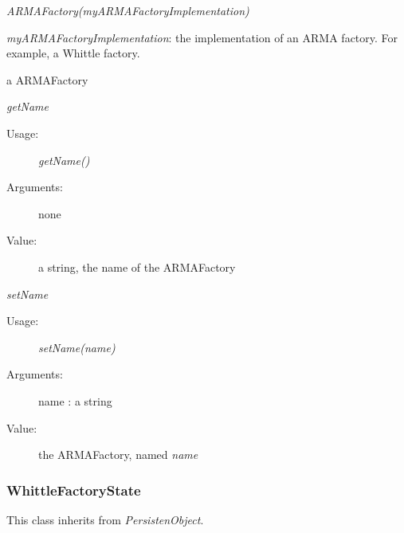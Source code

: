\begin{description}

\item[Usage:] \rule{0pt}{1em}
\begin{description}
\item \textit{ARMAFactory(myARMAFactoryImplementation)}
\end{description}
\bigskip

\item[Arguments:] \textit{myARMAFactoryImplementation}: the implementation of an ARMA factory. For example, a Whittle factory.

\bigskip

\item[Value:] a ARMAFactory
\bigskip

\item[Some methods :]  \rule{0pt}{1em}

\begin{description}

\item \textit{getName}
\begin{description}
\item[Usage:] \textit{getName()}
\item[Arguments:] none
\item[Value:] a string, the name of the ARMAFactory
\end{description}
\bigskip

\item \textit{setName}
\begin{description}
\item[Usage:] \textit{setName(name)}
\item[Arguments:] name : a string
\item[Value:] the ARMAFactory, named \textit{name}
\end{description}
\bigskip


\end{description}

\end{description}


\newpage
\subsubsection{WhittleFactoryState}

This class inherits from \textit{PersistenObject}.\\

